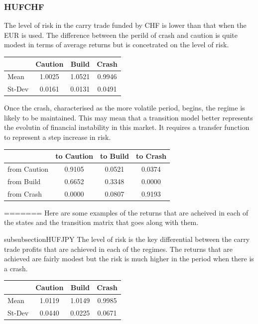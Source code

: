 \documentclass[12pt, a4paper, oneside]{article} %
\begin{document}
\subsubsection{HUFCHF}
The level of risk in the carry trade funded by CHF is lower than that when the EUR is used.  The difference between the perild of crash and caution is quite modest in terms of average returns but is concetrated on the level of risk.  

\begin{centering}
 \begin{tabular}{l c c c}
 & Caution & Build & Crash \\
 \hline
 Mean & 1.0025 & 1.0521 & 0.9946\\
 St-Dev & 0.0161 & 0.0131 & 0.0491\\
 \end{tabular}
 \end{centering}

Once the crash, characterised as the more volatile period, begins, the regime is likely to be maintained.  This may mean that a transition model better represents the evolutin of financial instability in this market. It requires a transfer function to represent a step increase in risk. 

 \begin{centering}
 \begin{tabular}{l c c c}
 & to Caution & to Build & to Crash\\
 \hline
 from Caution & 0.9105 & 0.0521 & 0.0374\\
 from Build & 0.6652 & 0.3348 & 0.0000\\
 from Crash & 0.0000 & 0.0807 & 0.9193
 \end{tabular}
 \end{centering}
=======
Here are some examples of the returns that are acheived in each of the states and the transition matrix that goes along with them.  

 
subsubsection{HUFJPY}
The level of risk is the key differential between the carry trade profits that are achieved in each of the regimes.  The returns that are achieved are fairly modest but the risk is much higher in the period when there is a crash.   

\begin{centering}
 \begin{tabular}{l c c c}
 & Caution & Build & Crash \\
 \hline
 Mean & 1.0119 & 1.0149 & 0.9985\\
 St-Dev & 0.0440 & 0.0225 & 0.0671\\
 \end{tabular}
 \end{centering}
\end{document}
